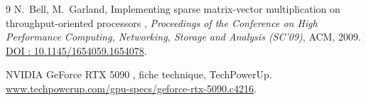 \documentclass{report}
\begin{document}
\begin{thebibliography}{9}
 N.~Bell, M.~Garland, \og Implementing sparse matrix-vector multiplication on throughput-oriented processors \fg, \emph{Proceedings of the Conference on High Performance Computing, Networking, Storage and Analysis (SC'09)}, ACM, 2009. \href{https://doi.org/10.1145/1654059.1654078}{DOI : 10.1145/1654059.1654078}.

 \og NVIDIA GeForce RTX 5090 \fg, fiche technique, TechPowerUp. \href{https://www.techpowerup.com/gpu-specs/geforce-rtx-5090.c4216}{www.techpowerup.com/gpu-specs/geforce-rtx-5090.c4216}.

\end{thebibliography}
\end{document}
